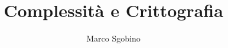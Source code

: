 \documentclass[a4paper, 12pt]{report}
\begin{document}
\title{Complessità e Crittografia}
\author{Marco Sgobino}
\maketitle
\tableofcontents


\part{}
\chapter{}
\section{}
\end{document}
